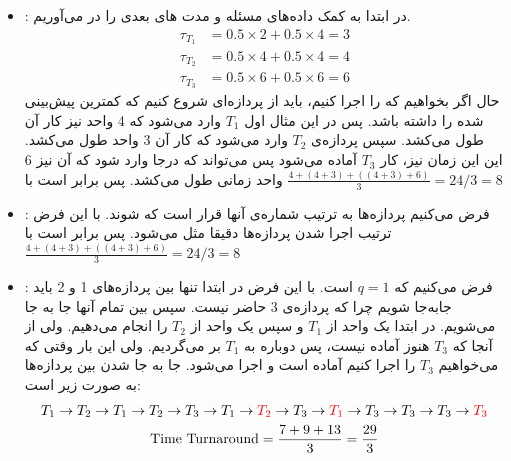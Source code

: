 \begin{itemize}
    \item \textbf{}:
    در ابتدا به کمک داده‌های مسئله و
    مدت
    های
    بعدی را در می‌آوریم.
    \begin{align*}
        \tau_{T_1} &= 0.5 \times 2 + 0.5 \times 4 = 3\\
        \tau_{T_2} &= 0.5 \times 4 + 0.5 \times 4 = 4\\
        \tau_{T_3} &= 0.5 \times 6 + 0.5 \times 6 = 6
    \end{align*}
    حال اگر بخواهیم که
    را اجرا کنیم، باید از پردازه‌ای شروع کنیم که کمترین
    پیش‌بینی شده را داشته باشد. پس در این مثال اول
    $T_1$
    وارد
    می‌شود که 4 واحد نیز کار آن طول می‌کشد. سپس پردازه‌ی
    $T_2$
    وارد می‌شود که کار آن 3 واحد طول می‌کشد. این این زمان نیز، کار
    $T_3$
    آماده می‌شود پس می‌تواند که درجا وارد
    شود که آن نیز 6 واحد زمانی طول می‌کشد.
    پس
    برابر است با
    $\frac{4 + (4 + 3) + ((4 + 3) + 6)}{3} = 24/3 = 8$
    \item \textbf{}:
    فرض می‌کنیم پردازه‌ها به ترتیب شماره‌ی آنها قرار است که
    شوند. با این فرض ترتیب اجرا شدن پردازه‌ها دقیقا مثل
    می‌شود. پس
    برابر است با
    $\frac{4 + (4 + 3) + ((4 + 3) + 6)}{3} = 24/3 = 8$
    \item \textbf{}: فرض می‌کنیم که
    $q = 1$
    است. با این فرض در ابتدا تنها بین پردازه‌های 1 و 2 باید جابه‌جا شویم چرا که پردازه‌ی 3 حاضر نیست.
    سپس بین تمام آنها جا به جا می‌شویم.
    در ابتدا یک واحد از
    $T_1$ و سپس یک واحد از $T_2$
    را انجام می‌دهیم. ولی از آنجا که
    $T_3$
    هنوز آماده نیست، پس دوباره به
    $T_1$
    بر می‌گردیم. ولی این بار وقتی که می‌خواهیم
    $T_3$
    را اجرا کنیم آماده است و اجرا می‌شود. جا به جا شدن بین پردازه‌ها به صورت زیر است:
    \begin{gather*}
        T_1 \rightarrow T_2 \rightarrow
        T_1 \rightarrow T_2 \rightarrow T_3 \rightarrow
        T_1 \rightarrow \textcolor{red}{T_2} \rightarrow T_3 \rightarrow
        \textcolor{red}{T_1} \rightarrow T_3
        \rightarrow T_3 \rightarrow T_3 \rightarrow \textcolor{red}{T_3}
        \\
        \text{Time Turnaround} = \frac{7 + 9 + 13}{3} = \frac{29}{3}
    \end{gather*}
\end{itemize}



